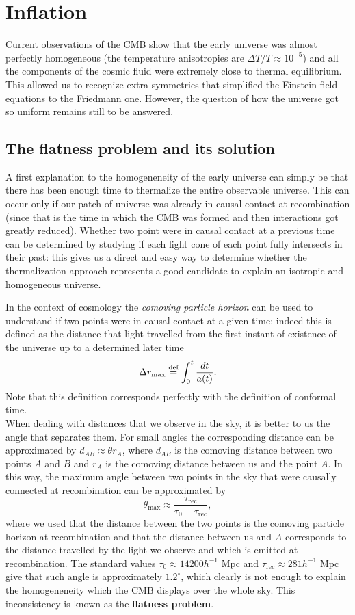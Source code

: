 \chapter{Inflation}
Current observations of the CMB show that the early universe was almost perfectly homogeneous (the temperature anisotropies are $\Delta T/T\approx 10^{-5}$) and all the components of the cosmic fluid were extremely close to thermal equilibrium. This allowed us to recognize extra symmetries that simplified the Einstein field equations to the Friedmann one. However, the question of how the universe got so uniform remains still to be answered. 
\section{The flatness problem and its solution}
A first explanation to the homogeneneity of the early universe can simply be that there has been enough time to thermalize the entire observable universe. This can occur only if our patch of universe was already in causal contact at recombination (since that is the time in which the CMB was formed and then interactions got greatly reduced). Whether two point were in causal contact at a previous time can be determined by studying if each light cone of each point fully intersects in their past: this gives us a direct and easy way to determine whether the thermalization approach represents a good candidate to explain an isotropic and homogeneous universe. 

In the context of cosmology the \emph{comoving particle horizon} can be used to understand if two points were in causal contact at a given time: indeed this is defined as the distance that light travelled from the first instant of existence of the universe up to a determined later time
\begin{equation}
    \Delta r_{\text{max}}\stackrel{\text{def}}{=}\int_0^t\frac{dt}{a(t)}.\label{eq:comoving_particle_horizon}
\end{equation}
Note that this definition corresponds perfectly with the definition of conformal time.\\When dealing with distances that we observe in the sky, it is better to us the angle that separates them. For small angles the corresponding distance can be approximated by $d_{AB}\approx \theta r_{A}$, where $d_{AB}$ is the comoving distance between two points $A$ and $B$ and $r_A$ is the comoving distance between us and the point $A$. In this way, the maximum angle between two points in the sky that were causally connected at recombination can be approximated by
$$\theta_\text{max}\approx\frac{\tau_\text{rec}}{\tau_0-\tau_\text{rec}},$$
where we used that the distance between the two points is the comoving particle horizon at recombination and that the distance between us and $A$ corresponds to the distance travelled by the light we observe and which is emitted at recombination. The standard values $\tau_0\approx 14200 h^{-1}$ Mpc and $\tau_\text{rec}\approx 281 h^{-1}$ Mpc give that such angle is approximately $1.2^\circ$, which clearly is not enough to explain the homogeneneity which the CMB displays over the whole sky. This inconsistency is known as the \textbf{flatness problem}.


